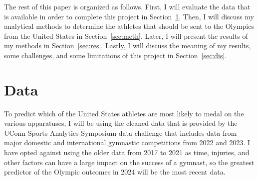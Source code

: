 \documentclass[12pt]{article}
\begin{document}
The rest of this paper is organized as follows. First, I will evaluate the data that is available in order to complete 
this project in Section~\ref{sec:data}. Then, I will discuss my 
analytical methods to determine the athletes that should be sent to the Olympics from the United States 
in Section~\ref{sec:meth}. Later, I will present the results of my 
methods in Section~\ref{sec:res}. Lastly, I will discuss the meaning of my results, some challenges, 
and some limitations of this project in Section~\ref{sec:dis}.


\section{Data}
\label{sec:data}

To predict which of the United States athletes are most likely to medal on the various apparatuses, 
I will be using the cleaned data that is provided by the UConn Sports Analytics Symposium data challenge 
that includes data from major domestic and international gymnastic competitions from 2022 and 2023. 
I have opted against using the older data from 2017 to 2021 as time, injuries, 
and other factors can have a large impact on the success of a gymnast, so the greatest predictor
of the Olympic outcomes in 2024 will be the most recent data.
\end{document}
